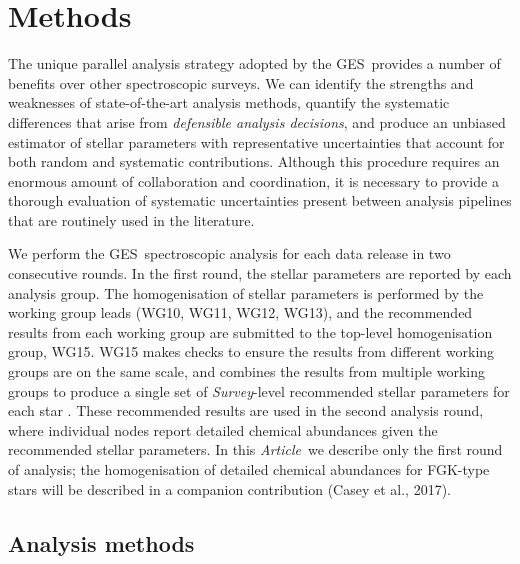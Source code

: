 \documentclass[preprint]{aastex}
\newcommand{\acronym}[1]{{\small{#1}}}
\newcommand{\article}{\textit{Article}}
\newcommand{\ges}{\acronym{GES}}
\begin{document}




\section{Methods}
\label{sec:methods}

The unique parallel analysis strategy adopted by the \ges\ provides a number of
benefits over other spectroscopic surveys.  We can identify the strengths and
weaknesses of state-of-the-art analysis methods, quantify the systematic 
differences that arise from \emph{defensible analysis decisions}, and produce an 
unbiased estimator of stellar parameters with representative uncertainties that account
for both random and systematic contributions.  Although this procedure requires an
enormous amount of collaboration and coordination, it is necessary to provide
a thorough evaluation of systematic uncertainties present between analysis 
pipelines that are routinely used in the literature.


We perform the \ges\ spectroscopic analysis for each data release in two 
consecutive rounds.  In the first round, the stellar parameters are reported by
each analysis group.  The homogenisation of stellar parameters is performed by the
working group leads (WG10, WG11, WG12, WG13), and the recommended results from each
working group are submitted to the top-level homogenisation group, WG15. WG15 makes
checks to ensure the results from different working groups are on the same scale, 
and combines the results from multiple working groups to produce a single set of 
\emph{Survey}-level recommended stellar parameters for each star \citep{Hourihane:2017}.
These recommended results are used in the second analysis round, where individual 
nodes report detailed chemical abundances given the recommended stellar parameters.
In this \article\ we describe only the first round of analysis; the homogenisation 
of detailed chemical abundances for FGK-type stars will be described in a companion 
contribution (Casey et al., 2017).


\subsection{Analysis methods}
\label{sec:analysis-nodes}
\end{document}
